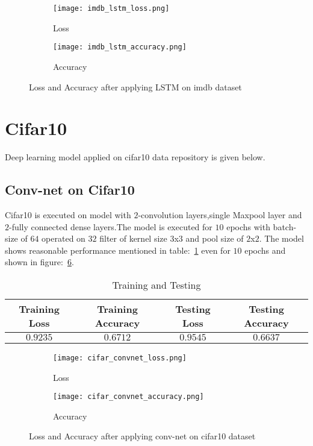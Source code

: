 \documentclass[12pt,a4paper,titlepage]{report}
\begin{document}
\begin{figure}[H]
\centering
\begin{subfigure}[h]{0.45\linewidth}
\texttt{[image: imdb\_lstm\_loss.png]}
\caption{Loss}
\label{fig:a}
\end{subfigure}
\quad
\begin{subfigure}[h]{0.45\linewidth}
\texttt{[image: imdb\_lstm\_accuracy.png]}
\caption{Accuracy}
\label{fig:b}
\end{subfigure}
\caption{Loss and Accuracy after applying LSTM on imdb dataset}
\label{fig: Image13}
\end{figure}

\section{Cifar10}
Deep learning model applied on cifar10 data repository is given below.

\subsection{Conv-net on Cifar10}
Cifar10 is executed on model with $2$-convolution layers,single Maxpool layer and $2$-fully connected dense layers.The model is executed for $10$ epochs with batch-size of $64$ operated on $32$ filter of kernel size $3$x$3$ and pool size of $2$x$2$. The model shows reasonable performance mentioned in table:~\ref{tab: Table-25} even for $10$ epochs and shown in figure:~\ref{fig: Image14}. 
\vspace{20pt}
\begin{table}[H]
\centering
\caption{Training and Testing}
\label{tab: Table-25}
\begin{tabular}{c c c c}
\hline
\textbf{Training Loss} & \textbf{Training Accuracy} & \textbf{Testing Loss} & \textbf{Testing Accuracy}\\
\hline
$0.9235$ & $0.6712$ & $0.9545$ & $0.6637$\\
\hline
\end{tabular}
\end{table}

\begin{figure}[H]
\centering
\begin{subfigure}[h]{0.45\linewidth}
\texttt{[image: cifar\_convnet\_loss.png]}
\caption{Loss}
\label{fig:a}
\end{subfigure}
\quad
\begin{subfigure}[h]{0.45\linewidth}
\texttt{[image: cifar\_convnet\_accuracy.png]}
\caption{Accuracy}
\label{fig:b}
\end{subfigure}
\caption{Loss and Accuracy after applying conv-net on cifar10 dataset}
\label{fig: Image14}
\end{figure}
\end{document}
